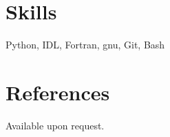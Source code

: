 \documentclass[margin,line]{cv}
\begin{document}
\begin{resume}
\begin{etaremune}

\end{etaremune}

\section{\sc Skills}
Python, IDL, Fortran, gnu, Git, Bash


\section{\sc References }
Available upon request.

\end{resume}
\end{document}
